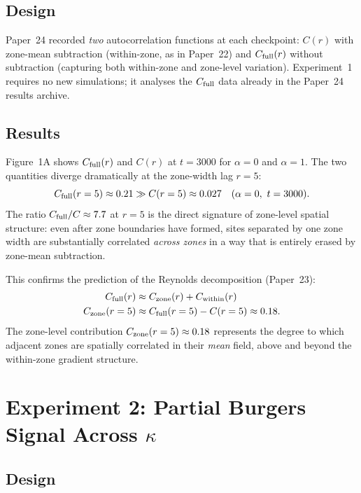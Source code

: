 \documentclass[11pt]{article}
\begin{document}
\subsection{Design}

Paper~24 recorded \emph{two} autocorrelation functions at each checkpoint:
$C(r)$ with zone-mean subtraction (within-zone, as in Paper~22) and
$C_{\rm full}(r)$ without subtraction (capturing both within-zone and
zone-level variation).
Experiment~1 requires no new simulations; it analyses the $C_{\rm full}$
data already in the Paper~24 results archive.

\subsection{Results}

Figure~1A shows $C_{\rm full}(r)$ and $C(r)$ at $t=3000$ for $\alpha=0$
and $\alpha=1$.
The two quantities diverge dramatically at the zone-width lag $r=5$:
\begin{equation}
  C_{\rm full}(r=5) \approx 0.21 \gg C(r=5) \approx 0.027
  \quad (\alpha=0,\ t=3000).
  \label{eq:two_scale_ratio}
\end{equation}
The ratio $C_{\rm full}/C \approx 7.7$ at $r=5$ is the direct signature
of zone-level spatial structure: even after zone boundaries have formed,
sites separated by one zone width are substantially correlated
\emph{across zones} in a way that is entirely erased by zone-mean subtraction.

This confirms the prediction of the Reynolds decomposition (Paper~23):
\begin{align}
  C_{\rm full}(r) &\approx C_{\rm zone}(r) + C_{\rm within}(r) \notag \\
  C_{\rm zone}(r=5) &\approx C_{\rm full}(r=5) - C(r=5) \approx 0.18.
\end{align}
The zone-level contribution $C_{\rm zone}(r=5) \approx 0.18$ represents
the degree to which adjacent zones are spatially correlated in their
\emph{mean} field, above and beyond the within-zone gradient structure.

\section{Experiment 2: Partial Burgers Signal Across $\kappa$}

\subsection{Design}
\end{document}
